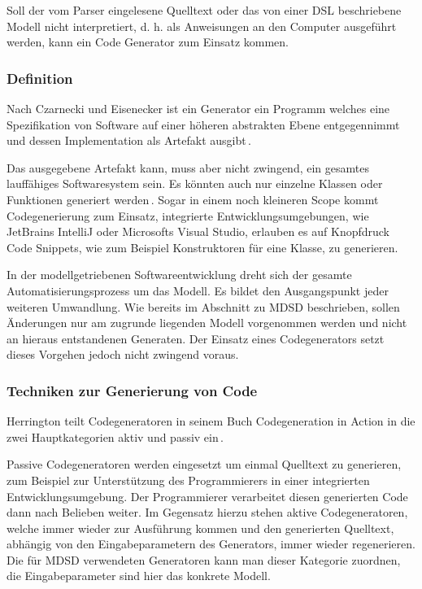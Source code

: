 \documentclass[12pt,oneside,a4paper,parskip]{scrbook}
\begin{document}
Soll der vom Parser eingelesene Quelltext oder das von einer DSL beschriebene Modell nicht interpretiert, d. h. als Anweisungen an den Computer ausgeführt werden, kann ein Code Generator zum Einsatz kommen.

\subsubsection{Definition}

Nach Czarnecki und Eisenecker ist ein Generator ein Programm welches eine Spezifikation von Software auf einer höheren abstrakten Ebene entgegennimmt und dessen Implementation als Artefakt ausgibt\,\cite[S. 333]{czaeis2000}.

Das ausgegebene Artefakt kann, muss aber nicht zwingend, ein gesamtes lauffähiges Softwaresystem sein. Es könnten auch nur einzelne Klassen oder Funktionen generiert werden\,\cite[S. 333]{czaeis2000}. Sogar in einem noch kleineren Scope kommt Codegenerierung zum Einsatz, integrierte Entwicklungsumgebungen, wie JetBrains IntelliJ oder Microsofts Visual Studio, erlauben es auf Knopfdruck Code Snippets, wie zum Beispiel Konstruktoren für eine Klasse, zu generieren.

In der modellgetriebenen Softwareentwicklung dreht sich der gesamte Automatisierungsprozess um das Modell. Es bildet den Ausgangspunkt jeder weiteren Umwandlung. Wie bereits im Abschnitt zu MDSD beschrieben, sollen Änderungen nur am zugrunde liegenden Modell vorgenommen werden und nicht an hieraus entstandenen Generaten. Der Einsatz eines Codegenerators setzt dieses Vorgehen jedoch nicht zwingend voraus.

\subsubsection{Techniken zur Generierung von Code}

Herrington teilt Codegeneratoren in seinem Buch Codegeneration in Action in die zwei Hauptkategorien aktiv und passiv ein\,\cite[S. 28]{herrington2003}. 

Passive Codegeneratoren werden eingesetzt um einmal Quelltext zu generieren, zum Beispiel zur Unterstützung des Programmierers in einer integrierten Entwicklungsumgebung. Der Programmierer verarbeitet diesen generierten Code dann nach Belieben weiter. Im Gegensatz hierzu stehen aktive Codegeneratoren, welche immer wieder zur Ausführung kommen und den generierten Quelltext, abhängig von den Eingabeparametern des Generators, immer wieder regenerieren. Die für MDSD verwendeten Generatoren kann man dieser Kategorie zuordnen, die Eingabeparameter sind hier das konkrete Modell. 
\end{document}
